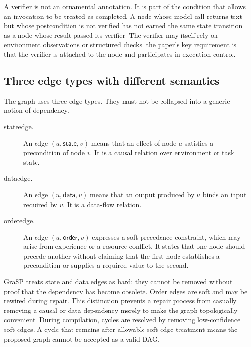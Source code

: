 A verifier is not an ornamental annotation. It is part of the condition that allows an invocation to be treated as completed. A node whose model call returns text but whose postcondition is not verified has not earned the same state transition as a node whose result passed its verifier. The verifier may itself rely on environment observations or structured checks; the paper's key requirement is that the verifier is attached to the node and participates in execution control.

\subsection{Three edge types with different semantics}

The graph uses three edge types. They must not be collapsed into a generic notion of dependency.

\begin{description}
  \item[\gls{stateedge}.] An edge \((u,\textsf{state},v)\) means that an effect of node \(u\) satisfies a precondition of node \(v\). It is a causal relation over environment or task state.
  \item[\gls{dataedge}.] An edge \((u,\textsf{data},v)\) means that an output produced by \(u\) binds an input required by \(v\). It is a data-flow relation.
  \item[\gls{orderedge}.] An edge \((u,\textsf{order},v)\) expresses a soft precedence constraint, which may arise from experience or a resource conflict. It states that one node should precede another without claiming that the first node establishes a precondition or supplies a required value to the second.
\end{description}

GraSP treats state and data edges as hard: they cannot be removed without proof that the dependency has become obsolete. Order edges are soft and may be rewired during repair. This distinction prevents a repair process from casually removing a causal or data dependency merely to make the graph topologically convenient. During compilation, cycles are resolved by removing low-confidence soft edges. A cycle that remains after allowable soft-edge treatment means the proposed graph cannot be accepted as a valid DAG.\autocite{xia2026grasp}


